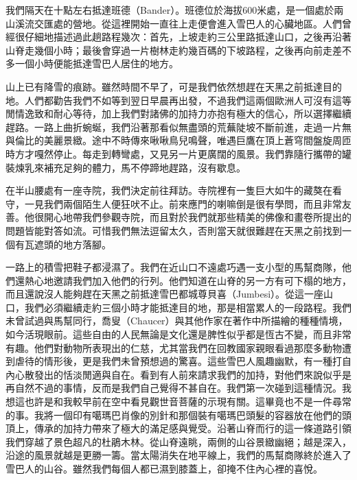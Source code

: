 我們隔天在十點左右抵達班德（Bander）。班德位於海拔600米處，是一個處於兩山溪流交匯處的營地。從這裡開始一直往上走便會進入雪巴人的心臟地區。人們曾經很仔細地描述過此趟路程幾次：首先，上坡走約三公里路抵達山口，之後再沿著山脊走幾個小時；最後會穿過一片樹林走約幾百碼的下坡路程，之後再向前走差不多一個小時便能抵達雪巴人居住的地方。

山上已有降雪的痕跡。雖然時間不早了，可是我們依然想趕在天黑之前抵達目的地。人們都勸告我們不如等到翌日早晨再出發，不過我們這兩個歐洲人可沒有這等閒情逸致和耐心等待，加上我們對諸佛的加持力亦抱有極大的信心，所以選擇繼續趕路。一路上曲折蜿蜒，我們沿著那看似無盡頭的荒蕪陡坡不斷前進，走過一片無與倫比的美麗景緻。途中不時傳來啾啾鳥兒鳴聲，唯遇巨鷹在頂上蒼穹間盤旋周匝時方才嘎然停止。每走到轉彎處，又見另一片更廣闊的風景。我們靠隨行攜帶的罐裝煉乳來補充足夠的體力，馬不停蹄地趕路，沒有歇息。

在半山腰處有一座寺院，我們決定前往拜訪。寺院裡有一隻巨大如牛的藏獒在看守，一見我們兩個陌生人便狂吠不止。前來應門的喇嘛倒是很有學問，而且非常友善。他很開心地帶我們參觀寺院，而且對於我們就那些精美的佛像和畫卷所提出的問題皆能對答如流。可惜我們無法逗留太久，否則當天就很難趕在天黑之前找到一個有瓦遮頭的地方落腳。

一路上的積雪把鞋子都浸濕了。我們在近山口不遠處巧遇一支小型的馬幫商隊，他們還熱心地邀請我們加入他們的行列。他們知道在山脊的另一方有可下榻的地方，而且還說沒人能夠趕在天黑之前抵達雪巴都城尊貝喜（Jumbesi）。從這一座山口，我們必須繼續走約三個小時才能抵達目的地，那是相當累人的一段路程。我們未曾試過與馬幫同行，喬叟（Chaucer）與其他作家在著作中所描繪的種種情境，如今活現眼前。這些自由的人民無論是文化還是脾性似乎都是恆古不變，而且非常有趣。他們對動物所表現出的仁慈，尤其當我們在回教國家親眼看過那麼多動物遭到虐待的情形後，更是我們未曾預想過的驚喜。這些雪巴人風趣幽默，有一種打自內心散發出的恬淡閒適與自在。看到有人前來請求我們的加持，對他們來說似乎是再自然不過的事情，反而是我們自己覺得不甚自在。我們第一次碰到這種情況。我想這也許是和我較早前在空中看見觀世音菩薩的示現有關。這畢竟也不是一件尋常的事。我將一個印有噶瑪巴肖像的別針和那個裝有噶瑪巴頭髮的容器放在他們的頭頂上，傳承的加持力帶來了極大的滿足感與覺受。沿著山脊而行的這一條道路引領我們穿越了景色超凡的杜鵑木林。從山脊遠眺，兩側的山谷景緻幽絕；越是深入，沿途的風景就越是更勝一籌。當太陽消失在地平線上，我們的馬幫商隊終於進入了雪巴人的山谷。雖然我們每個人都已濕到膝蓋上，卻掩不住內心裡的喜悅。

